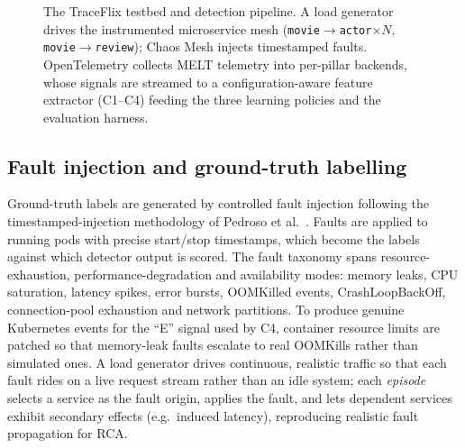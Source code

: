 \documentclass[acmsmall]{acmart}
\begin{document}
\begin{figure}[t]
{}
\caption{The TraceFlix testbed and detection pipeline. A load generator drives the
instrumented microservice mesh (\texttt{movie}$\rightarrow$\texttt{actor}$\times N$,
\texttt{movie}$\rightarrow$\texttt{review}); Chaos Mesh injects timestamped faults.
OpenTelemetry collects MELT telemetry into per-pillar backends, whose signals are
streamed to a configuration-aware feature extractor (C1--C4) feeding the three
learning policies and the evaluation harness.}\label{fig:arch}
\end{figure}

\subsection{Fault injection and ground-truth labelling}\label{sec:method-faults}

Ground-truth labels are generated by controlled fault injection following the timestamped-injection methodology of Pedroso et al.\ \cite{pedroso2025}. Faults are applied to running pods with precise start/stop timestamps, which become the labels against which detector output is scored. The fault taxonomy spans resource-exhaustion, performance-degradation and availability modes: memory leaks, CPU saturation, latency spikes, error bursts, OOMKilled events, CrashLoopBackOff, connection-pool exhaustion and network partitions. To produce genuine Kubernetes events for the ``E'' signal used by C4, container resource limits are patched so that memory-leak faults escalate to real OOMKills rather than simulated ones. A load generator drives continuous, realistic traffic so that each fault rides on a live request stream rather than an idle system; each \emph{episode} selects a service as the fault origin, applies the fault, and lets dependent services exhibit secondary effects (e.g.\ induced latency), reproducing realistic fault propagation for RCA.
\end{document}
